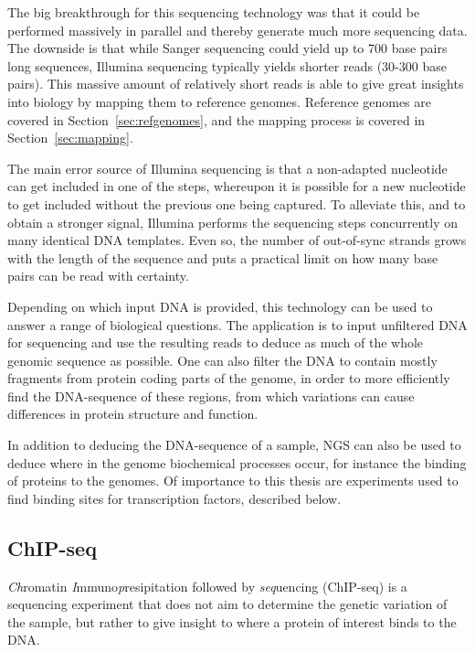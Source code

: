 The big breakthrough for this sequencing technology was that it could be performed massively in parallel and thereby generate much more sequencing data.
The downside is that while Sanger sequencing could yield up to 700 base pairs long sequences, Illumina sequencing typically yields shorter reads (30-300 base pairs).
This massive amount of relatively short reads is able to give great insights into biology by mapping them to reference genomes.
Reference genomes are covered in Section~\ref{sec:refgenomes}, and the mapping process is covered in Section~\ref{sec:mapping}.


The main error source of Illumina sequencing is that a non-adapted nucleotide can get included in one of the steps, whereupon it is possible for a new nucleotide to get included without the previous one being captured.
To alleviate this, and to obtain a stronger signal, Illumina performs the sequencing steps concurrently on many identical DNA templates. Even so, the number of out-of-sync strands grows with the length of the sequence and puts a practical limit on how many base pairs can be read with certainty.

Depending on which input DNA is provided, this technology can be used to answer a range of biological questions.
The  application is to input unfiltered DNA for sequencing and use the resulting reads to deduce as much of the whole genomic sequence as possible. One can also filter the DNA to contain mostly fragments from protein coding parts of the genome, in order to more efficiently find the DNA-sequence of these regions, from which variations can cause differences in protein structure and function.

In addition to deducing the DNA-sequence of a sample, NGS can also be used to deduce where in the genome biochemical processes occur, for instance the binding of proteins to the genomes. Of importance to this thesis are experiments used to find binding sites for transcription factors, described below.

\subsection{ChIP-seq}
\emph{Ch}romatin \emph{I}mmuno\emph{p}resipitation  followed by \emph{seq}uencing (ChIP-seq) is a sequencing experiment that does not aim to determine the genetic variation of the sample, but rather to give insight to where a protein of interest binds to the DNA.

